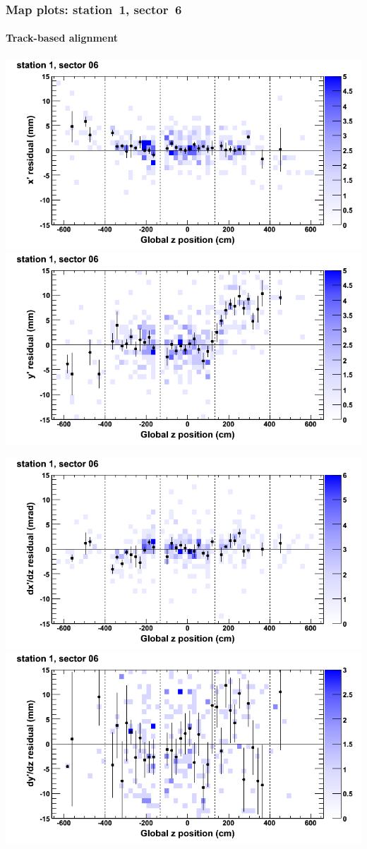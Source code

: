 \documentclass[compress]{beamer}
\begin{document}
\begin{frame}
\frametitle{Map plots: station~1, sector~6}
\framesubtitle{Track-based alignment}
\includegraphics[width=0.5\linewidth]{mapplots_re05/DTvsz_st1sec06_x.png}
\includegraphics[width=0.5\linewidth]{mapplots_re05/DTvsz_st1sec06_y.png}

\includegraphics[width=0.5\linewidth]{mapplots_re05/DTvsz_st1sec06_dxdz.png}
\includegraphics[width=0.5\linewidth]{mapplots_re05/DTvsz_st1sec06_dydz.png}
\end{frame}
\end{document}
